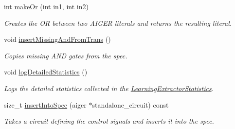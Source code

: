 \begin{DoxyCompactItemize}
int \hyperlink{classLearningImplExtractor_a25260410178b107783cbc10fdf69c52d}{make\-Or} (int in1, int in2)
\begin{DoxyCompactList}\small\item\em Creates the O\-R between two A\-I\-G\-E\-R literals and returns the resulting literal. \end{DoxyCompactList}\item 
void \hyperlink{classLearningImplExtractor_a8b95b5433b25e475efaaba9c553c4e63}{insert\-Missing\-And\-From\-Trans} ()
\begin{DoxyCompactList}\small\item\em Copies missing A\-N\-D gates from the spec. \end{DoxyCompactList}\item 
void \hyperlink{classLearningImplExtractor_aa14318d81871fc52f0d17fd5d82708e3}{log\-Detailed\-Statistics} ()
\begin{DoxyCompactList}\small\item\em Logs the detailed statistics collected in the \hyperlink{classLearningExtractorStatistics}{Learning\-Extractor\-Statistics}. \end{DoxyCompactList}\item 
size\-\_\-t \hyperlink{classCNFImplExtractor_a0970602635f3356712d57ebb28d12c0d}{insert\-Into\-Spec} (aiger $\ast$standalone\-\_\-circuit) const 
\begin{DoxyCompactList}\small\item\em Takes a circuit defining the control signals and inserts it into the spec. \end{DoxyCompactList}\end{DoxyCompactItemize}
